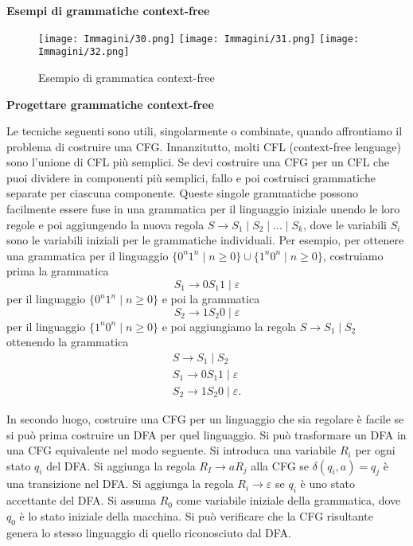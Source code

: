\documentclass{article}
\begin{document}
\textbf{Esempi di grammatiche context-free}

\begin{figure}[H]
    \centering
    \texttt{[image: Immagini/30.png]}
    \texttt{[image: Immagini/31.png]}
    \texttt{[image: Immagini/32.png]}
    \caption{Esempio di grammatica context-free}
    \label{fig:grammar_example1}
\end{figure}

\textbf{Progettare grammatiche context-free}
\vspace{1em}

Le tecniche seguenti sono utili, singolarmente o combinate, quando affrontiamo il problema di costruire una CFG.
Innanzitutto, molti CFL (context-free lenguage) sono l'unione di CFL più semplici. Se devi costruire una CFG per un CFL che puoi dividere in componenti più semplici, fallo e poi costruisci grammatiche separate per ciascuna componente. Queste singole grammatiche possono facilmente essere fuse in una grammatica per il linguaggio iniziale unendo le loro regole e poi aggiungendo la nuova regola $S \rightarrow S_1 \mid S_2 \mid ... \mid S_k$, dove le variabili $S_i$ sono le variabili iniziali per le grammatiche individuali.
Per esempio, per ottenere una grammatica per il linguaggio $\{0^n 1^n \mid n \geq 0\} \cup \{1^n 0^n \mid n \geq 0\}$, costruiamo prima la grammatica
$$
S_1 \rightarrow 0S_1 1 \mid \varepsilon
$$
per il linguaggio $\{0^n 1^n \mid n \geq 0\}$ e poi la grammatica
$$
S_2 \rightarrow 1S_2 0 \mid \varepsilon
$$
per il linguaggio $\{1^n 0^n \mid n \geq 0\}$ e poi aggiungiamo la regola $S \rightarrow S_1 \mid S_2$ ottenendo la grammatica
\begin{align*}
    S \rightarrow S_1 \mid S_2 \\
    S_1 \rightarrow 0S_1 1 \mid \varepsilon \\
    S_2 \rightarrow 1S_2 0 \mid \varepsilon.
\end{align*}

In secondo luogo, costruire una CFG per un linguaggio che sia regolare è facile se si può prima costruire un DFA per quel linguaggio. Si può trasformare un DFA in una CFG equivalente nel modo seguente. Si introduca una variabile $R_i$ per ogni stato $q_i$ del DFA. Si aggiunga la regola $R_I \rightarrow aR_j$ alla CFG se $\delta(q_i,a) = q_j$ è una transizione nel DFA. Si aggiunga la regola $R_i \rightarrow \varepsilon$ se $q_i$ è uno stato accettante del DFA. Si assuma $R_0$ come variabile iniziale della grammatica, dove $q_0$ è lo stato iniziale della macchina. Si può verificare che la CFG risultante genera lo stesso linguaggio di quello riconosciuto dal DFA.
\vspace{2em}
\end{document}
